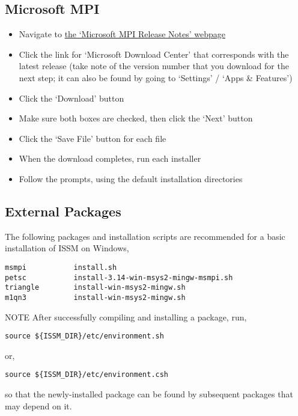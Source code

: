 \subsection{Microsoft MPI}
\begin{itemize}
	\item Navigate to \href{https://docs.microsoft.com/en-us/message-passing-interface/microsoft-mpi-release-notes}{the `Microsoft MPI Release Notes' webpage}
	\item Click the link for `Microsoft Download Center' that corresponds with the latest release (take note of the version number that you download for the next step; it can also be found by going to `Settings' / `Apps \& Features')
	\item Click the `Download' button
	\item Make sure both boxes are checked, then click the `Next' button
	\item Click the `Save File' button for each file
	\item When the download completes, run each installer
	\item Follow the prompts, using the default installation directories
\end{itemize}

\subsection{External Packages}
The following packages and installation scripts are recommended for a basic installation of ISSM on Windows,

\begin{lstlisting}
msmpi			install.sh
petsc			install-3.14-win-msys2-mingw-msmpi.sh
triangle		install-win-msys2-mingw.sh
m1qn3			install-win-msys2-mingw.sh
\end{lstlisting}

\begin{calloutHighlight}{NOTE}
After successfully compiling and installing a package, run,

\begin{lstlisting}
source ${ISSM_DIR}/etc/environment.sh
\end{lstlisting}

or,

\begin{lstlisting}
source ${ISSM_DIR}/etc/environment.csh
\end{lstlisting}

so that the newly-installed package can be found by subsequent packages that may depend on it.
\end{calloutHighlight}

